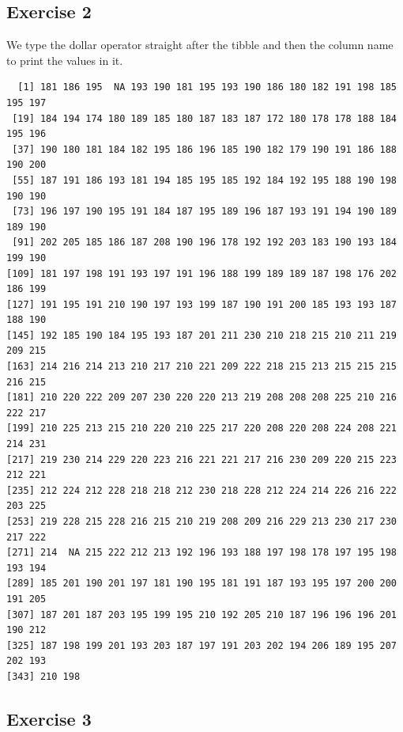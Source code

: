 \documentclass[
  letterpaper,
  DIV=11,
  numbers=noendperiod]{scrreprt}
\newenvironment{Shaded}{\begin{snugshade}}{\end{snugshade}}
\newcommand{\NormalTok}[1]{\textcolor[rgb]{0.00,0.23,0.31}{#1}}
\newcommand{\SpecialCharTok}[1]{\textcolor[rgb]{0.37,0.37,0.37}{#1}}
\begin{document}
\subsection{Exercise 2}\label{exercise-2-2}

We type the dollar operator straight after the tibble and then the
column name to print the values in it.

\begin{Shaded}
\end{Shaded}

\begin{verbatim}
  [1] 181 186 195  NA 193 190 181 195 193 190 186 180 182 191 198 185 195 197
 [19] 184 194 174 180 189 185 180 187 183 187 172 180 178 178 188 184 195 196
 [37] 190 180 181 184 182 195 186 196 185 190 182 179 190 191 186 188 190 200
 [55] 187 191 186 193 181 194 185 195 185 192 184 192 195 188 190 198 190 190
 [73] 196 197 190 195 191 184 187 195 189 196 187 193 191 194 190 189 189 190
 [91] 202 205 185 186 187 208 190 196 178 192 192 203 183 190 193 184 199 190
[109] 181 197 198 191 193 197 191 196 188 199 189 189 187 198 176 202 186 199
[127] 191 195 191 210 190 197 193 199 187 190 191 200 185 193 193 187 188 190
[145] 192 185 190 184 195 193 187 201 211 230 210 218 215 210 211 219 209 215
[163] 214 216 214 213 210 217 210 221 209 222 218 215 213 215 215 215 216 215
[181] 210 220 222 209 207 230 220 220 213 219 208 208 208 225 210 216 222 217
[199] 210 225 213 215 210 220 210 225 217 220 208 220 208 224 208 221 214 231
[217] 219 230 214 229 220 223 216 221 221 217 216 230 209 220 215 223 212 221
[235] 212 224 212 228 218 218 212 230 218 228 212 224 214 226 216 222 203 225
[253] 219 228 215 228 216 215 210 219 208 209 216 229 213 230 217 230 217 222
[271] 214  NA 215 222 212 213 192 196 193 188 197 198 178 197 195 198 193 194
[289] 185 201 190 201 197 181 190 195 181 191 187 193 195 197 200 200 191 205
[307] 187 201 187 203 195 199 195 210 192 205 210 187 196 196 196 201 190 212
[325] 187 198 199 201 193 203 187 197 191 203 202 194 206 189 195 207 202 193
[343] 210 198
\end{verbatim}

\subsection{Exercise 3}\label{exercise-3-1}
\end{document}
